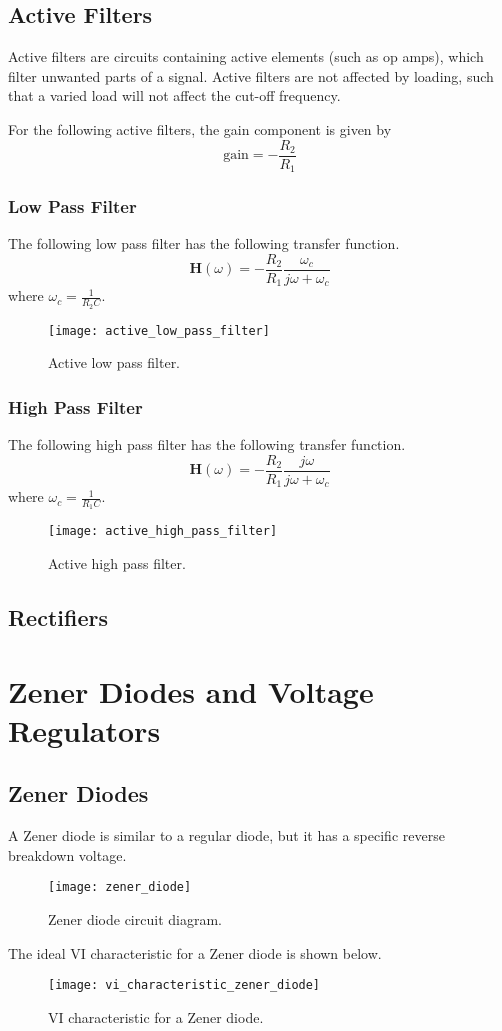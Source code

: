 \documentclass{article}
\begin{document}
\subsection{Active Filters}
Active filters are circuits containing active elements (such as op amps),
which filter unwanted parts of a signal.
Active filters are not affected by loading, such that a varied load will
not affect the cut-off frequency.

For the following active filters, the gain component is given by
\begin{equation*}
    \mathrm{gain} = -\frac{R_2}{R_1}
\end{equation*}
\subsubsection{Low Pass Filter}
The following low pass filter has the following transfer function.
\begin{equation*}
    \symbf{H}(\omega) = -\frac{R_2}{R_1}\frac{\omega_c}{j\omega + \omega_c}
\end{equation*}
where $\omega_c = \frac{1}{R_2C}$.
\begin{figure}[H]
    \centering
    \texttt{[image: active\_low\_pass\_filter]}
    \caption{Active low pass filter.}
\end{figure}
\subsubsection{High Pass Filter}
The following high pass filter has the following transfer function.
\begin{equation*}
    \symbf{H}(\omega) = -\frac{R_2}{R_1}\frac{j\omega}{j\omega + \omega_c}
\end{equation*}
where $\omega_c = \frac{1}{R_1C}$.
\begin{figure}[H]
    \centering
    \texttt{[image: active\_high\_pass\_filter]}
    \caption{Active high pass filter.}
\end{figure}
\subsection{Rectifiers}
\newpage
\section{Zener Diodes and Voltage Regulators}
\subsection{Zener Diodes}
A Zener diode is similar to a regular diode, but it has a specific
reverse breakdown voltage.
\begin{figure}[H]
    \centering
    \texttt{[image: zener\_diode]}
    \caption{Zener diode circuit diagram.}
\end{figure}
The ideal VI characteristic for a Zener diode is shown below.
\begin{figure}[H]
    \centering
    \texttt{[image: vi\_characteristic\_zener\_diode]}
    \caption{VI characteristic for a Zener diode.}
\end{figure}
\end{document}
